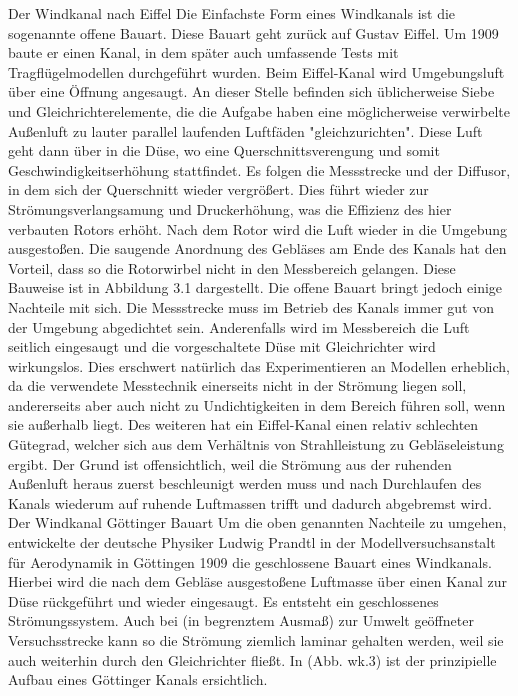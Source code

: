 \documentclass[a4paper,10pt]{scrartcl}
\begin{document}
Der Windkanal nach Eiffel
Die Einfachste Form eines Windkanals ist die sogenannte offene Bauart. Diese Bauart geht zurück auf
Gustav Eiffel. Um 1909 baute er einen Kanal, in dem später auch umfassende Tests mit Tragflügelmodellen durchgeführt wurden. Beim Eiffel-Kanal wird Umgebungsluft über eine Öffnung angesaugt.
An dieser Stelle befinden sich üblicherweise Siebe und Gleichrichterelemente, die die Aufgabe haben
eine möglicherweise verwirbelte Außenluft zu lauter parallel laufenden Luftfäden "gleichzurichten".
Diese Luft geht dann über in die Düse, wo eine Querschnittsverengung und somit Geschwindigkeitserhöhung stattfindet. Es folgen die Messstrecke und der Diffusor, in dem sich der Querschnitt
wieder vergrößert. Dies führt wieder zur Strömungsverlangsamung und Druckerhöhung, was die Effizienz des hier verbauten Rotors erhöht. Nach dem Rotor wird die Luft wieder in die Umgebung
ausgestoßen. Die saugende Anordnung des Gebläses am Ende des Kanals hat den Vorteil, dass so die
Rotorwirbel nicht in den Messbereich gelangen. Diese Bauweise ist in Abbildung 3.1 dargestellt. Die
offene Bauart bringt jedoch einige Nachteile mit sich. Die Messstrecke muss im Betrieb des Kanals
immer gut von der Umgebung abgedichtet sein. Anderenfalls wird im Messbereich die Luft seitlich
eingesaugt und die vorgeschaltete Düse mit Gleichrichter wird wirkungslos. Dies erschwert natürlich das Experimentieren an Modellen erheblich, da die verwendete Messtechnik einerseits nicht in
der Strömung liegen soll, andererseits aber auch nicht zu Undichtigkeiten in dem Bereich führen soll,
wenn sie außerhalb liegt. Des weiteren hat ein Eiffel-Kanal einen relativ schlechten Gütegrad, welcher
sich aus dem Verhältnis von Strahlleistung zu Gebläseleistung ergibt. Der Grund ist offensichtlich,
weil die Strömung aus der ruhenden Außenluft heraus zuerst beschleunigt werden muss und nach
Durchlaufen des Kanals wiederum auf ruhende Luftmassen trifft und dadurch abgebremst wird.
Der Windkanal Göttinger Bauart
Um die oben genannten Nachteile zu umgehen, entwickelte der deutsche Physiker Ludwig Prandtl
in der Modellversuchsanstalt für Aerodynamik in Göttingen 1909 die geschlossene Bauart eines
Windkanals. Hierbei wird die nach dem Gebläse ausgestoßene Luftmasse über einen Kanal zur Düse
rückgeführt und wieder eingesaugt. Es entsteht ein geschlossenes Strömungssystem. Auch bei (in begrenztem Ausmaß) zur Umwelt geöffneter Versuchsstrecke kann so die Strömung ziemlich laminar
gehalten werden, weil sie auch weiterhin durch den Gleichrichter fließt. In (Abb. wk.3) ist der prinzipielle Aufbau eines Göttinger Kanals ersichtlich.
\end{document}
